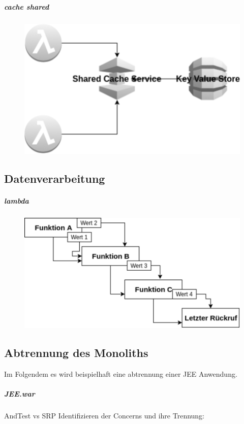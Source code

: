 \documentclass[
12pt,
english,
ngerman,
headsepline,
twoside,
openright,
numbers=noenddot,version=first
]{scrreprt}
\begin{document}
\subparagraph{cache shared }
\begin{figure}[H]
	\includegraphics[scale=0.2]{./pics/aws/pattern-cache-shared.eps}
\end{figure}

\subsection{Datenverarbeitung}

\subparagraph{lambda}

\begin{figure}[H]
	\includegraphics[scale=0.2]{./pics/aws/pattern-waterfall.eps}
\end{figure}



\subsection{Abtrennung des Monoliths}

Im Folgendem es wird beispielhaft eine abtrennung einer JEE Anwendung.

\subparagraph{JEE.war}
\glqq And\grqq Test vs SRP
Identifizieren der Concerns und ihre Trennung: 
\end{document}
